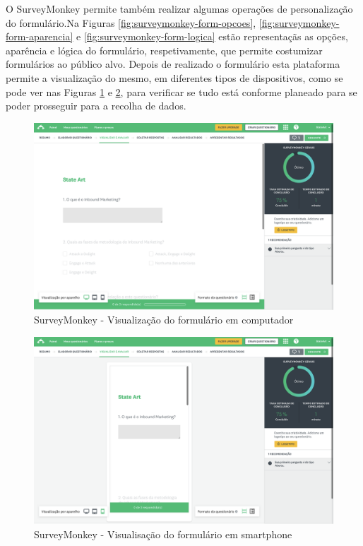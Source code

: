 O SurveyMonkey permite também realizar algumas operações de personalização do formulário.Na Figuras \ref{fig:surveymonkey-form-opcoes}, \ref{fig:surveymonkey-form-aparencia} e \ref{fig:surveymonkey-form-logica} estão representaçãs as opções, aparência e lógica do formulário, respetivamente, que permite costumizar formulários ao público alvo. 
Depois de realizado o formulário esta plataforma permite a visualização do mesmo, em diferentes tipos de dispositivos, como se pode ver nas Figuras \ref{fig:surveymonkey-form-test-pc} e \ref{fig:surveymonkey-form-test-phone}, para verificar se tudo está conforme planeado para se poder prosseguir para a recolha de dados. 
 \newpage

\begin{figure}[ht!]
	\begin{center}
		\includegraphics[width=1\textwidth]{img/surveymonkey-form-test-pc}
		\caption{SurveyMonkey - Visualização do formulário em computador }
		\label{fig:surveymonkey-form-test-pc}
	\end{center}
\end{figure}

\begin{figure}[ht!]
	\begin{center}
		\includegraphics[width=1\textwidth]{img/surveymonkey-form-test-phone}
		\caption{SurveyMonkey - Visualisação do formulário em smartphone }
		\label{fig:surveymonkey-form-test-phone}
	\end{center}
\end{figure}

